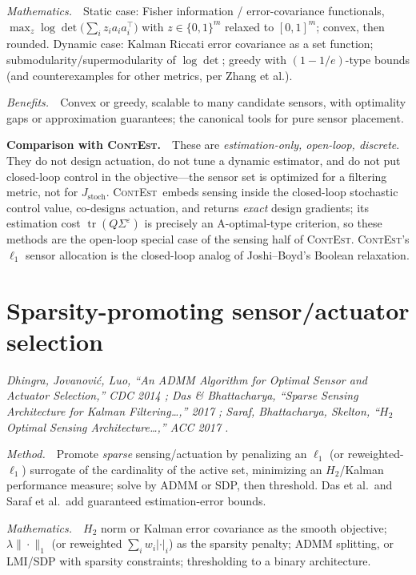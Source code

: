 \documentclass[11pt]{article}
\DeclareMathOperator{\tr}{tr}
\newcommand{\ContEst}{\textsc{ContEst}}
\newcommand{\Method}{\smallskip\noindent\textit{Method.}~}
\newcommand{\Maths}{\smallskip\noindent\textit{Mathematics.}~}
\newcommand{\Benefits}{\smallskip\noindent\textit{Benefits.}~}
\newcommand{\Versus}{\smallskip\noindent\textbf{Comparison with \ContEst.}~}
\begin{document}
\Maths\ Static case: Fisher information / error-covariance functionals,
$\max_z \log\det\big(\sum_i z_i a_i a_i^\top\big)$ with $z\in\{0,1\}^m$ relaxed to
$[0,1]^m$; convex, then rounded. Dynamic case: Kalman Riccati error covariance as a
set function; submodularity/supermodularity of $\log\det$; greedy with
$(1-1/e)$-type bounds (and counterexamples for other metrics, per Zhang et al.).

\Benefits\ Convex or greedy, scalable to many candidate sensors, with optimality
gaps or approximation guarantees; the canonical tools for pure sensor placement.

\Versus\ These are \emph{estimation-only, open-loop, discrete}. They do not design
actuation, do not tune a dynamic estimator, and do not put closed-loop control in
the objective---the sensor set is optimized for a filtering metric, not for
$J_{\mathrm{stoch}}$. \ContEst\ embeds sensing inside the closed-loop stochastic
control value, co-designs actuation, and returns \emph{exact} design gradients; its
estimation cost $\tr(Q\Sigma^\varepsilon)$ is precisely an A-optimal-type criterion,
so these methods are the open-loop special case of the sensing half of \ContEst.
\ContEst's $\ell_1$ sensor allocation is the closed-loop analog of Joshi--Boyd's
Boolean relaxation.

\section{Sparsity-promoting sensor/actuator selection}\label{sec:sparse}
\noindent\emph{Dhingra, Jovanovi\'c, Luo, ``An ADMM Algorithm for Optimal Sensor
and Actuator Selection,'' CDC 2014 \cite{dhingra2014admm}; Das \& Bhattacharya,
``Sparse Sensing Architecture for Kalman Filtering\dots,'' 2017
\cite{das2017sparse}; Saraf, Bhattacharya, Skelton, ``$H_2$ Optimal Sensing
Architecture\dots,'' ACC 2017 \cite{saraf2017h2}.}

\Method\ Promote \emph{sparse} sensing/actuation by penalizing an $\ell_1$ (or
reweighted-$\ell_1$) surrogate of the cardinality of the active set, minimizing an
$H_2$/Kalman performance measure; solve by ADMM or SDP, then threshold. Das et al.\
and Saraf et al.\ add guaranteed estimation-error bounds.

\Maths\ $H_2$ norm or Kalman error covariance as the smooth objective;
$\lambda\|\cdot\|_1$ (or reweighted $\sum_i w_i|\cdot|_i$) as the sparsity penalty;
ADMM splitting, or LMI/SDP with sparsity constraints; thresholding to a binary
architecture.
\end{document}
